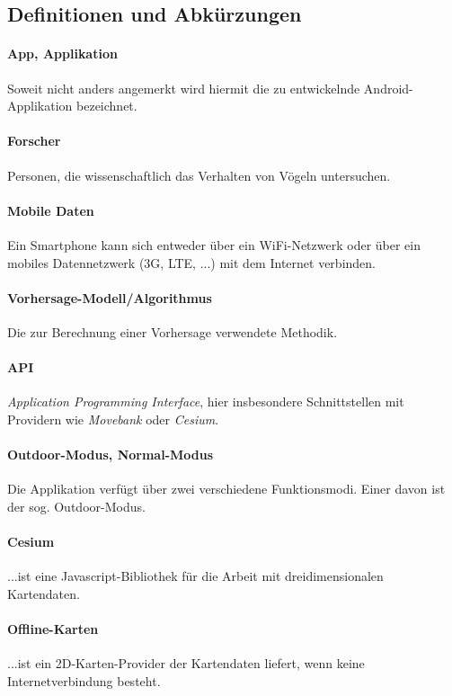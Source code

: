 \documentclass[12pt]{article} %
\begin{document}


\subsection{Definitionen und Abkürzungen}

	\paragraph{App, Applikation} Soweit nicht anders angemerkt wird hiermit die zu entwickelnde Android-Applikation bezeichnet.
	 \paragraph{Forscher} Personen, die wissenschaftlich das Verhalten von Vögeln untersuchen.
	 \paragraph{Mobile Daten} Ein Smartphone kann sich entweder über ein WiFi-Netzwerk oder über ein mobiles Datennetzwerk (3G, LTE, ...) mit dem Internet verbinden. 
	\paragraph{Vorhersage-Modell/Algorithmus} Die zur Berechnung einer Vorhersage verwendete Methodik. 
	\paragraph{API} \textit{Application Programming Interface}, hier insbesondere Schnittstellen mit Providern wie \textit{Movebank} oder \textit{Cesium}. 
	\paragraph{Outdoor-Modus, Normal-Modus} Die Applikation verfügt über zwei verschiedene Funktionsmodi. Einer davon ist der sog. Outdoor-Modus.
	\paragraph{Cesium} ...ist eine Javascript-Bibliothek für die Arbeit mit dreidimensionalen Kartendaten.
	\paragraph{Offline-Karten} ...ist ein 2D-Karten-Provider der Kartendaten liefert, wenn keine Internetverbindung besteht.
\end{document}
